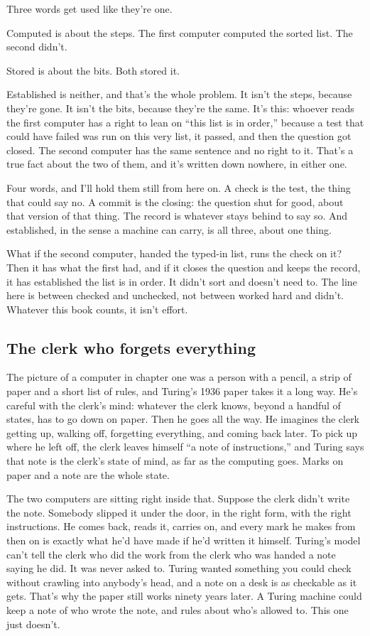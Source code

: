 \documentclass[11pt,twoside]{article}
\theoremstyle{thielethm}
\theoremstyle{thieledef}
\theoremstyle{thieledef}
\theoremstyle{thieledef}
\theoremstyle{thielethm}
\theoremstyle{thieleobs}
\theoremstyle{thielethm}
\begin{document}
Three words get used like they're one.

Computed is about the steps. The first computer computed the sorted list. The second didn't.

Stored is about the bits. Both stored it.

Established is neither, and that's the whole problem. It isn't the steps, because they're gone. It isn't the bits, because they're the same. It's this: whoever reads the first computer has a right to lean on ``this list is in order,'' because a test that could have failed was run on this very list, it passed, and then the question got closed. The second computer has the same sentence and no right to it. That's a true fact about the two of them, and it's written down nowhere, in either one.

Four words, and I'll hold them still from here on. A check is the test, the thing that could say no. A commit is the closing: the question shut for good, about that version of that thing. The record is whatever stays behind to say so. And established, in the sense a machine can carry, is all three, about one thing.

What if the second computer, handed the typed-in list, runs the check on it? Then it has what the first had, and if it closes the question and keeps the record, it has established the list is in order. It didn't sort and doesn't need to. The line here is between checked and unchecked, not between worked hard and didn't. Whatever this book counts, it isn't effort.

\subsection{The clerk who forgets everything}

The picture of a computer in chapter one was a person with a pencil, a strip of paper and a short list of rules, and Turing's 1936 paper takes it a long way. He's careful with the clerk's mind: whatever the clerk knows, beyond a handful of states, has to go down on paper. Then he goes all the way. He imagines the clerk getting up, walking off, forgetting everything, and coming back later. To pick up where he left off, the clerk leaves himself ``a note of instructions,'' and Turing says that note is the clerk's state of mind, as far as the computing goes. Marks on paper and a note are the whole state.

The two computers are sitting right inside that. Suppose the clerk didn't write the note. Somebody slipped it under the door, in the right form, with the right instructions. He comes back, reads it, carries on, and every mark he makes from then on is exactly what he'd have made if he'd written it himself. Turing's model can't tell the clerk who did the work from the clerk who was handed a note saying he did. It was never asked to. Turing wanted something you could check without crawling into anybody's head, and a note on a desk is as checkable as it gets. That's why the paper still works ninety years later. A Turing machine could keep a note of who wrote the note, and rules about who's allowed to. This one just doesn't.
\end{document}
